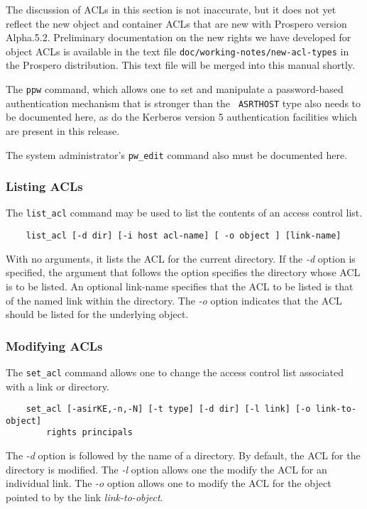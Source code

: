 The discussion of ACLs in this section is not inaccurate, but it does
not yet reflect the new object and container ACLs that are new with
Prospero version Alpha.5.2.  Preliminary documentation on the new
rights we have developed for object ACLs is available in the text file
{\tt doc/working-notes/new-acl-types} in the Prospero distribution.
This text file will be merged into this manual shortly.

The {\tt ppw} command, which allows one to set and manipulate a
password-based authentication mechanism that is stronger than the {\tt
ASRTHOST} type also needs to be documented here, as do the Kerberos
version 5 authentication facilities which are present in this release.

The system administrator's {\tt pw\_edit} command also must be
documented here.

\subsubsection*{Listing ACLs}

The {\tt list\_acl} command  may be used to list the contents of an
access control list.

\begin{verbatim}
    list_acl [-d dir] [-i host acl-name] [ -o object ] [link-name]
\end{verbatim}

With no arguments, it lists the ACL for the current directory.  If the
{\em -d} option is specified, the argument that follows the option
specifies the directory whose ACL is to be listed.  An optional
link-name specifies that the ACL to be listed is that of the named
link within the directory.  The {\em -o} option indicates that the ACL
should be listed for the underlying object.

\subsubsection*{Modifying ACLs}

The {\tt set\_acl} command allows one to change the access control list
associated with a link or directory.

\begin{verbatim}
    set_acl [-asirKE,-n,-N] [-t type] [-d dir] [-l link] [-o link-to-object] 
		rights principals
\end{verbatim}

The {\em -d} option is followed by the name of a directory.  By
default, the ACL for the directory is modified.  The {\em -l} option
allows one the modify the ACL for an individual link.  The {\em -o}
option allows one to modify the ACL for the object pointed to by the
link {\em link-to-object}.

